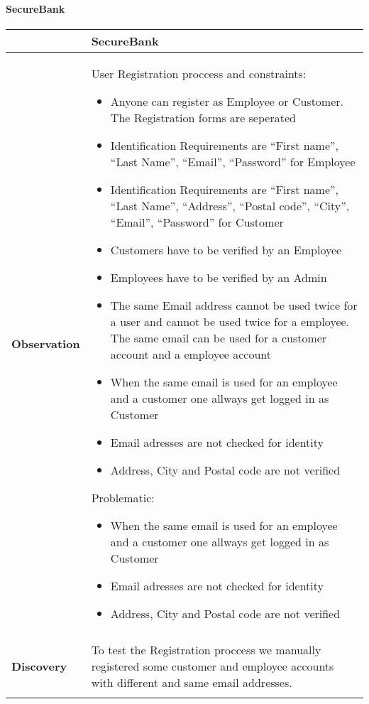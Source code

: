 \paragraph{SecureBank} \mbox{}
\begin{longtable*}{p{.20\textwidth} | p{.80\textwidth}}
    \hline
    & \textbf{SecureBank} \\ 
    \hline
    \textbf{Observation} &
        User Registration proccess and constraints:
		\begin{itemize}
		  \item Anyone can register as Employee or Customer. The Registration forms are seperated
		  \item Identification Requirements are \enquote{First name}, \enquote{Last Name}, \enquote{Email}, \enquote{Password} for Employee
		  \item Identification Requirements are \enquote{First name}, \enquote{Last Name}, \enquote{Address}, \enquote{Postal code}, \enquote{City}, \enquote{Email}, \enquote{Password} for Customer
		  \item Customers have to be verified by an Employee
		  \item Employees have to be verified by an Admin
		  \item The same Email address cannot be used twice for a user and cannot be used twice for a employee. The same email can be used for a customer account and a employee account
		  \item When the same email is used for an employee and a customer one allways get logged in as Customer
		  \item Email adresses are not checked for identity
		  \item Address, City and Postal code are not verified
		\end{itemize}
		Problematic:
		\begin{itemize}
		  \item When the same email is used for an employee and a customer one allways get logged in as Customer
		  \item Email adresses are not checked for identity
		  \item Address, City and Postal code are not verified
		\end{itemize}
    \\\\
    \textbf{Discovery} &
    	To test the Registration proccess we manually registered some customer and employee accounts with different and same email addresses.
    \\\\

\end{longtable*}
